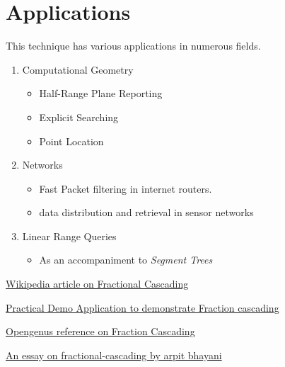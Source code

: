 \documentclass[11pt]{article}
\begin{document}


\section{Applications}
This technique has various applications in numerous fields. \\
\begin{enumerate}
    \item Computational Geometry
    \begin{itemize}
        \item Half-Range Plane Reporting
        \item Explicit Searching 
        \item Point Location
    \end{itemize}
    \item Networks
    \begin{itemize}
        \item Fast Packet filtering in internet routers.
        \item data distribution and retrieval in sensor networks
    \end{itemize}
    \item Linear Range Queries
        \begin{itemize}
            \item As an accompaniment to \textit{Segment Trees}
        \end{itemize}
\end{enumerate}



\pagebreak 
\begin{thebibliography}{}

\href{https://en.wikipedia.org/wiki/Fractional_cascading}{Wikipedia article on Fractional Cascading}

\href{https://ravix339.github.io/FractionalCascading/}{Practical Demo Application to demonstrate Fraction cascading}

\href{https://iq.opengenus.org/fractional-cascading-in-binary-search/amp/}{Opengenus reference on Fraction Cascading}

\href{https://arpitbhayani.me/blogs/fractional-cascading}{An essay on fractional-cascading by arpit bhayani}

\end{thebibliography}
\end{document}
